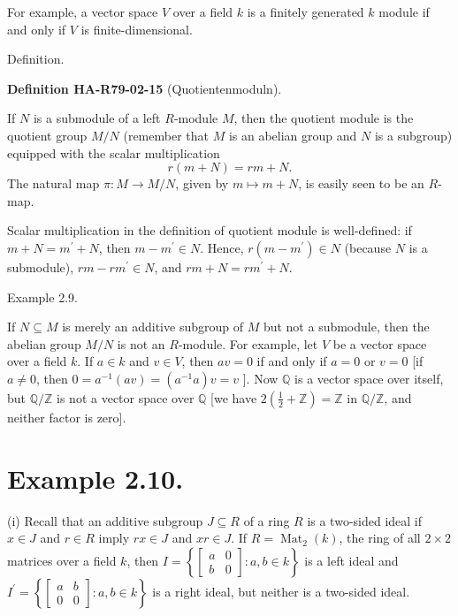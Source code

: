 \documentclass[10pt, letterpaper]{article}
\newcommand{\CustomHeading}[3]{%
  \par\medskip\noindent%
  \textbf{#1 #2} \textnormal{(#3)}.\enskip%
}
\newenvironment{DEF}[2]{\begin{unitbox}\CustomHeading{Definition}{#1}{#2}}{\end{unitbox}}
\begin{document}
For example, a vector space $V$ over a field $k$ is a finitely generated $k$ module if and only if $V$ is finite-dimensional.

Definition. 

\begin{DEF}{HA-R79-02-15}{Quotientenmoduln}
If $N$ is a submodule of a left $R$-module $M$, then the quotient module is the quotient group $M / N$ (remember that $M$ is an abelian group and $N$ is a subgroup) equipped with the scalar multiplication
$$
r(m+N)=r m+N .
$$
The natural map $\pi: M \rightarrow M / N$, given by $m \mapsto m+N$, is easily seen to be an $R$-map.

Scalar multiplication in the definition of quotient module is well-defined: if $m+N=m^{\prime}+N$, then $m-m^{\prime} \in N$. Hence, $r\left(m-m^{\prime}\right) \in N$ (because $N$ is a submodule), $r m-r m^{\prime} \in N$, and $r m+N=r m^{\prime}+N$.
\end{DEF}



Example 2.9. 

If $N \subseteq M$ is merely an additive subgroup of $M$ but not a submodule, then the abelian group $M / N$ is not an $R$-module. For example, let $V$ be a vector space over a field $k$. If $a \in k$ and $v \in V$, then $a v=0$ if and only if $a=0$ or $v=0$ [if $a \neq 0$, then $0=a^{-1}(a v)=\left(a^{-1} a\right) v=v$ ]. Now $\mathbb{Q}$ is a vector space over itself, but $\mathbb{Q} / \mathbb{Z}$ is not a vector space over $\mathbb{Q}$ [we have $2\left(\frac{1}{2}+\mathbb{Z}\right)=\mathbb{Z}$ in $\mathbb{Q} / \mathbb{Z}$, and neither factor is zero].

\section*{Example 2.10.}

(i) Recall that an additive subgroup $J \subseteq R$ of a ring $R$ is a two-sided ideal if $x \in J$ and $r \in R$ imply $r x \in J$ and $x r \in J$. If $R=\operatorname{Mat}_{2}(k)$, the ring of all $2 \times 2$ matrices over a field $k$, then $I=\left\{\left[\begin{array}{cc}a & 0 \\ b & 0\end{array}\right]: a, b \in k\right\}$ is a left ideal and $I^{\prime}=\left\{\left[\begin{array}{cc}a & b \\ 0 & 0\end{array}\right]: a, b \in k\right\}$ is a right ideal, but neither is a two-sided ideal.
\end{document}
